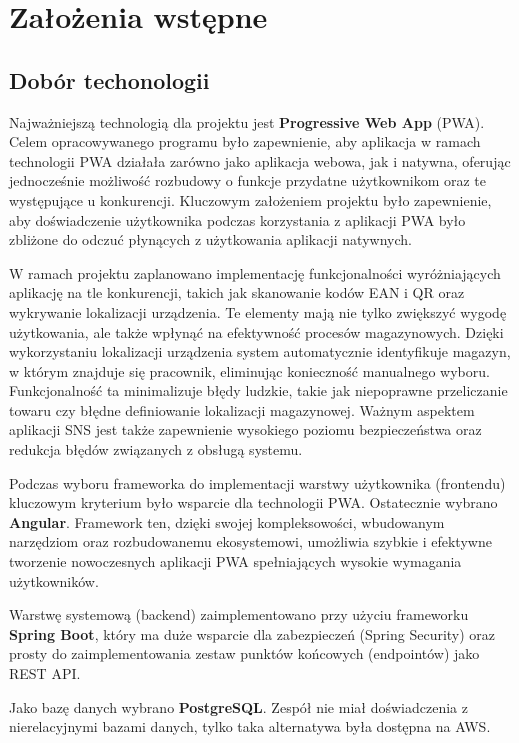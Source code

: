 \documentclass[../main.tex]{subfiles}
\begin{document}
\section{Założenia wstępne}
    \subsection{Dobór techonologii}
        Najważniejszą technologią dla projektu jest \textbf{Progressive Web App} (PWA)\cite{pwa}. Celem opracowywanego programu było zapewnienie, aby aplikacja w ramach technologii PWA działała zarówno jako aplikacja webowa, jak i natywna, oferując jednocześnie możliwość rozbudowy o funkcje przydatne użytkownikom oraz te występujące u konkurencji. Kluczowym założeniem projektu było zapewnienie, aby doświadczenie użytkownika podczas korzystania z aplikacji PWA było zbliżone do odczuć płynących z użytkowania aplikacji natywnych.

        W ramach projektu zaplanowano implementację funkcjonalności wyróżniających aplikację na tle konkurencji, takich jak skanowanie kodów EAN i QR oraz wykrywanie lokalizacji urządzenia. Te elementy mają nie tylko zwiększyć wygodę użytkowania, ale także wpłynąć na efektywność procesów magazynowych. Dzięki wykorzystaniu lokalizacji urządzenia system automatycznie identyfikuje magazyn, w którym znajduje się pracownik, eliminując konieczność manualnego wyboru. Funkcjonalność ta minimalizuje błędy ludzkie, takie jak niepoprawne przeliczanie towaru czy błędne definiowanie lokalizacji magazynowej. Ważnym aspektem aplikacji SNS jest także zapewnienie wysokiego poziomu bezpieczeństwa oraz redukcja błędów związanych z obsługą systemu.

        Podczas wyboru frameworka do implementacji warstwy użytkownika (frontendu) kluczowym kryterium było wsparcie dla technologii PWA. Ostatecznie wybrano \textbf{Angular}\cite{angular}. Framework ten, dzięki swojej kompleksowości, wbudowanym narzędziom oraz rozbudowanemu ekosystemowi, umożliwia szybkie i efektywne tworzenie nowoczesnych aplikacji PWA spełniających wysokie wymagania użytkowników.

        Warstwę systemową (backend) zaimplementowano przy użyciu frameworku \textbf{Spring Boot}\cite{springboot}, który ma duże wsparcie dla zabezpieczeń (Spring Security) oraz prosty do zaimplementowania zestaw punktów końcowych (endpointów) jako REST API.

        Jako bazę danych wybrano \textbf{PostgreSQL}\cite{postgresql}. Zespół nie miał doświadczenia z nierelacyjnymi bazami danych, tylko taka alternatywa była dostępna na AWS.
\end{document}
